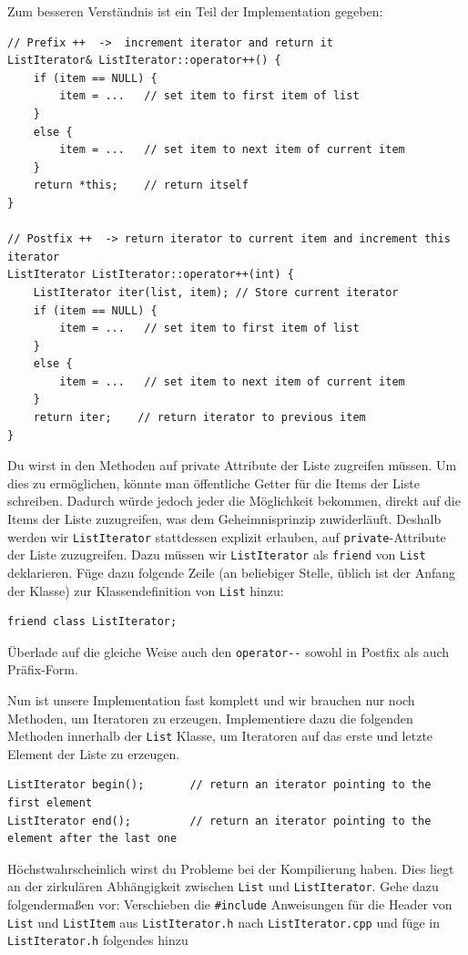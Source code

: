 Zum besseren Verständnis ist ein Teil der Implementation gegeben:

\begin{lstlisting}
// Prefix ++  ->  increment iterator and return it
ListIterator& ListIterator::operator++() {
	if (item == NULL) {
		item = ...	 // set item to first item of list
	}
	else {
		item = ...	 // set item to next item of current item
	}
	return *this;	 // return itself
}

// Postfix ++  -> return iterator to current item and increment this iterator
ListIterator ListIterator::operator++(int) {
	ListIterator iter(list, item); // Store current iterator
	if (item == NULL) {
		item = ...	 // set item to first item of list
	}
	else {
		item = ...	 // set item to next item of current item
	}
	return iter; 	// return iterator to previous item
}
\end{lstlisting}

Du wirst in den Methoden auf private Attribute der Liste zugreifen müssen. Um dies zu ermöglichen, könnte man öffentliche Getter für die Items der Liste schreiben.
Dadurch würde jedoch jeder die Möglichkeit bekommen, direkt auf die Items der Liste zuzugreifen, was dem Geheimnisprinzip zuwiderläuft.
Deshalb werden wir \texttt{ListIterator} stattdessen explizit erlauben, auf \texttt{private}-Attribute der Liste zuzugreifen.
Dazu müssen wir \texttt{ListIterator} als \texttt{friend} von \texttt{List} deklarieren.
Füge dazu folgende Zeile (an beliebiger Stelle, üblich ist der Anfang der Klasse) zur Klassendefinition von \texttt{List} hinzu:
\begin{lstlisting}
friend class ListIterator;
\end{lstlisting}

Überlade auf die gleiche Weise auch den \texttt{operator-{}-} sowohl in Postfix als auch Präfix-Form.

Nun ist unsere Implementation fast komplett und wir brauchen nur noch Methoden, um Iteratoren zu erzeugen.
Implementiere dazu die folgenden Methoden innerhalb der \texttt{List} Klasse, um Iteratoren auf das erste und letzte Element der Liste zu erzeugen.
\begin{lstlisting}
ListIterator begin();		// return an iterator pointing to the first element
ListIterator end();			// return an iterator pointing to the element after the last one
\end{lstlisting}

Höchstwahrscheinlich wirst du Probleme bei der Kompilierung haben.
Dies liegt an der zirkulären Abhängigkeit zwischen \texttt{List} und \texttt{ListIterator}.
Gehe dazu folgendermaßen vor:
Verschieben die \texttt{\#include} Anweisungen für die Header von \texttt{List} und \texttt{ListItem} aus \texttt{ListIterator.h} nach \texttt{ListIterator.cpp} und füge in \texttt{ListIterator.h} folgendes hinzu

